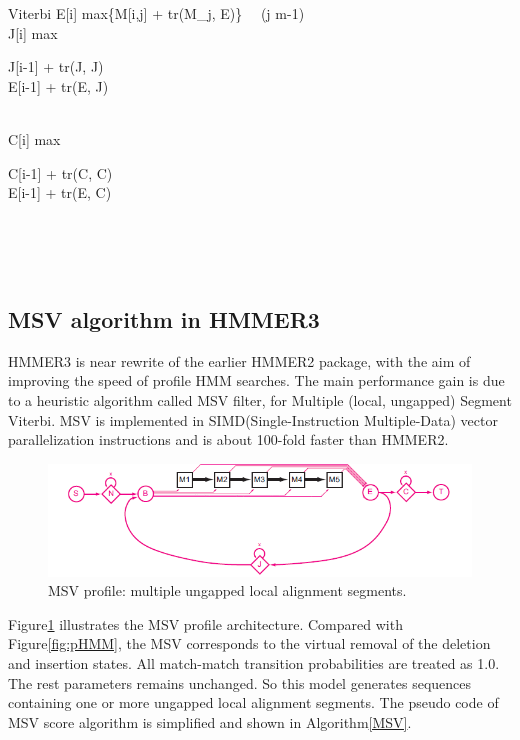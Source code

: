 \begin{pseudocode}{Viterbi}{ }
  E[i] \GETS max\{M[i,j] + tr(M_j, E)\} \ \  (j  \TO m-1)\\
  J[i] \GETS max 
  \begin{cases}
   J[i-1] + tr(J, J)\\
   E[i-1] + tr(E, J)
  \end{cases}\\
  C[i] \GETS max
  \begin{cases}
   C[i-1] + tr(C, C)\\
   E[i-1] + tr(E, C)
  \end{cases}\\
\END\\
\\
\end{pseudocode}

\subsection{MSV algorithm in HMMER3}

\label{MSVsub}

HMMER3 is near rewrite of the earlier HMMER2 package, with the aim of improving the speed of profile HMM searches. The main performance gain is due to a heuristic algorithm called MSV filter, for Multiple (local, ungapped) Segment Viterbi. MSV is implemented in SIMD(Single-Instruction Multiple-Data) vector parallelization instructions and is about 100-fold faster than HMMER2.

\begin{figure}[!htb]
	\includegraphics[width=150mm]{Figures/pHMM_msv.png}
	\caption{MSV profile: multiple ungapped local alignment segments\citep{HMMER3}.}
	\label{fig:pMSV}
\end{figure}

Figure\ref{fig:pMSV} illustrates the MSV profile architecture. Compared with Figure\ref{fig:pHMM}, the MSV corresponds to the virtual removal of the deletion and insertion states. All match-match transition probabilities are treated as 1.0. The rest parameters remains unchanged. So this model generates sequences containing one or
 more ungapped local alignment segments. The pseudo code of MSV score algorithm is simplified and shown in Algorithm\ref{MSV}.


